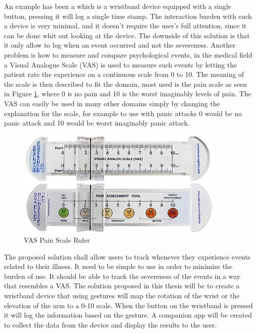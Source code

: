 An example has been a  which is a wristband device equipped with a single button, pressing it will log a single time stamp. The interaction burden with such a device is very minimal, and it doesn't require the user's full attention, since it can be done whit out looking at the device. The downside of this solution is that it only allow to log when an event occurred and not the severeness. Another problem is how to measure and compare psychological events, in the medical field a Visual Analogue Scale (VAS) is used to measure such events by letting the patient rate the experience on a continuous scale from 0 to 10. The meaning of the scale is then described to fit the domain, most used is the pain scale as seen in Figure \ref{real_vas}, where 0 is no pain and 10 is the worst imaginably levels of pain. The VAS can easily be used in many other domains simply by changing the explanation for the scale, for example to use with panic attacks 0 would be no panic attack and 10 would be worst imaginably panic attack.

\begin{figure}[h!]
    \centering
    \includegraphics[width=0.9\textwidth]{figures/real_vas.jpg}
    \caption{VAS Pain Scale Ruler\cite{real_vas}}
    \label{real_vas}
\end{figure}

The proposed solution shall allow users to track whenever they experience events related to their illness. It need to be simple to use in order to minimize the burden of use. It should be able to track the severeness of the events in a way that resembles a VAS. The solution proposed in this thesis will be to create a wristband device that using gestures will map the rotation of the wrist or the elevation of the arm to a 0-10 scale. When the button on the wristband is pressed it will log the information based on the gesture. A companion app will be created to collect the data from the device and display the results to the user.

